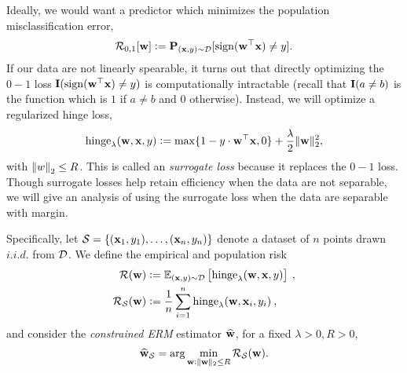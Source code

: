 \documentclass[preview]{standalone}
\begin{document}
Ideally, we would want a predictor which minimizes the population misclassification error,
\begin{align*}
\mathcal{R}_{0,1}[\boldsymbol{\mathbf{w}}] := \mathbf{P}_{(\boldsymbol{\mathbf{x}}, y) \sim \mathcal{D}}[\operatorname*{sign}(\boldsymbol{\mathbf{w}}^\top \boldsymbol{\mathbf{x}}) \ne y].
\end{align*}
If our data are not linearly spearable, it turns out that directly optimizing the $0-1$ loss $\mathbf{I}(\operatorname*{sign}(\boldsymbol{\mathbf{w}}^\top \boldsymbol{\mathbf{x}}) \ne  y)$ is computationally intractable (recall that $\mathbf{I}(a \ne b)$ is the function which is $1$ if $a \ne b$ and $0$ otherwise). Instead, we will optimize a regularized hinge loss,
\begin{align*}
\mathrm{hinge}_{\lambda}(\boldsymbol{\mathbf{w}},\boldsymbol{\mathbf{x}},y):= \max\{1 - y\cdot \boldsymbol{\mathbf{w}}^\top \boldsymbol{\mathbf{x}}, 0 \} + \frac{\lambda}{2}\|\boldsymbol{\mathbf{w}}\|_2^2,
\end{align*}
with $\norm{w}_2 \leq R$. This is called an \emph{surrogate loss} because it replaces the $0-1$ loss. Though surrogate losses help retain efficiency when the data are not separable, we will give an analysis of using the surrogate loss when the data are separable with margin.


Specifically, let $\mathcal{S} = \{(\boldsymbol{\mathbf{x}}_1,y_1),\dots,(\boldsymbol{\mathbf{x}}_n,y_n)\}$ denote a dataset of $n$ points drawn $i.i.d.$ from $\mathcal{D}$.
We define the empirical and population risk
\begin{align*}
\mathcal{R}(\boldsymbol{\mathbf{w}})&:= \mathbb{E}_{(\boldsymbol{\mathbf{x}},y)\sim \mathcal{D}} \left[\mathrm{hinge}_{\lambda}(\boldsymbol{\mathbf{w}},\boldsymbol{\mathbf{x}},y)\right] \:, \\
\mathcal{R}_{\mathcal{S}}(\boldsymbol{\mathbf{w}})&:= \frac{1}{n}\sum_{i=1}^n \mathrm{hinge}_{\lambda}(\boldsymbol{\mathbf{w}},\boldsymbol{\mathbf{x}}_i,y_i) \:,
\end{align*}
and consider the \emph{constrained ERM} estimator $\widehat{\boldsymbol{\mathbf{w}}}$, for a fixed $\lambda > 0, R > 0$,
\begin{align*}
\widehat{\boldsymbol{\mathbf{w}}}_{\mathcal{S}} = \arg\min_{\boldsymbol{\mathbf{w}}:\|\boldsymbol{\mathbf{w}}\|_2 \le R} \mathcal{R}_{\mathcal{S}}(\boldsymbol{\mathbf{w}}).
\end{align*}
\end{document}
